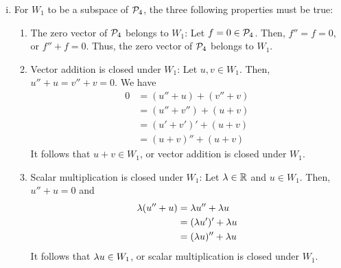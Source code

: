 \begin{sol}
    \begin{enumerate}[(i)]
        \item For $W_1$ to be a subspace of $\P_4$, the three following properties must be true:
        \begin{enumerate}[(1)]
            \item The zero vector of $\P_4$ belongs to $W_1$: Let $f=0\in\P_4$. Then, $f''=f=0$, or $f''+f=0$. Thus, the zero vector of $\P_4$ belongs to $W_1$.
            \item Vector addition is closed under $W_1$: Let $u,v\in W_1$. Then, $u''+u=v''+v=0$. We have
            \[
                \begin{aligned}
                    0 & = (u''+u)+(v''+v) \\
                      & = (u''+v'')+(u+v) \\
                      & = (u'+v')'+(u+v)  \\
                      & = (u+v)''+(u+v)
                \end{aligned}
            \]
            It follows that $u+v\in W_1$, or vector addition is closed under $W_1$.
            \item Scalar multiplication is closed under $W_1$: Let $\lam\in\R$ and $u\in W_1$. Then, $u''+u=0$ and
            \[
                \begin{aligned}
                    \lam(u''+u) & = \lam u''+\lam u   \\
                                & = (\lam u')'+\lam u \\
                                & = (\lam u)''+\lam u
                \end{aligned}
            \]
            It follows that $\lam u\in W_1$, or scalar multiplication is closed under $W_1$.


\end{enumerate}
\end{enumerate}
\end{sol}
